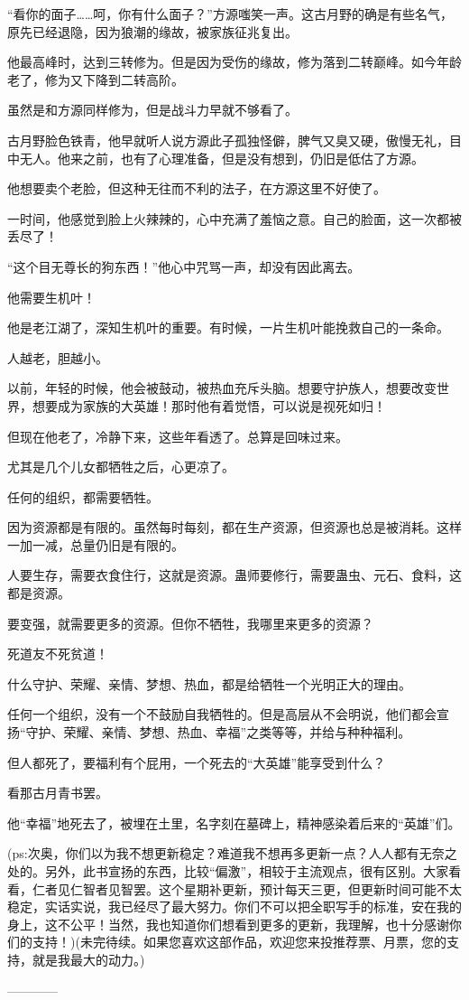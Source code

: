 \begin{this_body}
“看你的面子……呵，你有什么面子？”方源嗤笑一声。这古月野的确是有些名气，原先已经退隐，因为狼潮的缘故，被家族征兆复出。

他最高峰时，达到三转修为。但是因为受伤的缘故，修为落到二转巅峰。如今年龄老了，修为又下降到二转高阶。

虽然是和方源同样修为，但是战斗力早就不够看了。

古月野脸色铁青，他早就听人说方源此子孤独怪僻，脾气又臭又硬，傲慢无礼，目中无人。他来之前，也有了心理准备，但是没有想到，仍旧是低估了方源。

他想要卖个老脸，但这种无往而不利的法子，在方源这里不好使了。

一时间，他感觉到脸上火辣辣的，心中充满了羞恼之意。自己的脸面，这一次都被丢尽了！

“这个目无尊长的狗东西！”他心中咒骂一声，却没有因此离去。

他需要生机叶！

他是老江湖了，深知生机叶的重要。有时候，一片生机叶能挽救自己的一条命。

人越老，胆越小。

以前，年轻的时候，他会被鼓动，被热血充斥头脑。想要守护族人，想要改变世界，想要成为家族的大英雄！那时他有着觉悟，可以说是视死如归！

但现在他老了，冷静下来，这些年看透了。总算是回味过来。

尤其是几个儿女都牺牲之后，心更凉了。

任何的组织，都需要牺牲。

因为资源都是有限的。虽然每时每刻，都在生产资源，但资源也总是被消耗。这样一加一减，总量仍旧是有限的。

人要生存，需要衣食住行，这就是资源。蛊师要修行，需要蛊虫、元石、食料，这都是资源。

要变强，就需要更多的资源。但你不牺牲，我哪里来更多的资源？

死道友不死贫道！

什么守护、荣耀、亲情、梦想、热血，都是给牺牲一个光明正大的理由。

任何一个组织，没有一个不鼓励自我牺牲的。但是高层从不会明说，他们都会宣扬“守护、荣耀、亲情、梦想、热血、幸福”之类等等，并给与种种福利。

但人都死了，要福利有个屁用，一个死去的“大英雄”能享受到什么？

看那古月青书罢。

他“幸福”地死去了，被埋在土里，名字刻在墓碑上，精神感染着后来的“英雄”们。

(ps:次奥，你们以为我不想更新稳定？难道我不想再多更新一点？人人都有无奈之处的。另外，此书宣扬的东西，比较“偏激”，相较于主流观点，很有区别。大家看看，仁者见仁智者见智罢。这个星期补更新，预计每天三更，但更新时间可能不太稳定，实话实说，我已经尽了最大努力。你们不可以把全职写手的标准，安在我的身上，这不公平！当然，我也知道你们想看到更多的更新，我理解，也十分感谢你们的支持！)(未完待续。如果您喜欢这部作品，欢迎您来投推荐票、月票，您的支持，就是我最大的动力。)

------------

\end{this_body}

